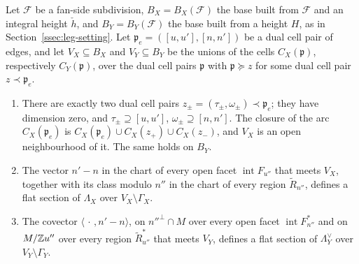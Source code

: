 \begin{lemma}\label{lem:closedarc}
Let $\mathcal F$ be a fan-side subdivision, $B_X=B_X(\mathcal F)$ the base built from $\mathcal F$ and an integral height
$\check h$, and $B_Y=B_Y(\mathcal F)$ the base built from a height $H$, as in Section~\ref{ssec:leg-setting}. Let
$\mathfrak p_e=([u,u'],[n,n'])$ be a dual cell pair of edges, and let $V_X\subseteq B_X$ and $V_Y\subseteq B_Y$ be the unions of
the cells $C_X(\mathfrak p)$, respectively $C_Y(\mathfrak p)$, over the dual cell pairs $\mathfrak p$ with $\mathfrak p\succeq z$ for
some dual cell pair $z\prec\mathfrak p_e$.
\begin{enumerate}
\item There are exactly two dual cell pairs $z_\pm=(\tau_\pm,\omega_\pm)\prec\mathfrak p_e$; they have dimension zero, and
$\tau_\pm\supseteq[u,u']$, $\omega_\pm\supseteq[n,n']$. The closure of the arc $C_X(\mathfrak p_e)$ is
$C_X(\mathfrak p_e)\cup C_X(z_+)\cup C_X(z_-)$, and $V_X$ is an open neighbourhood of it. The same holds on $B_Y$.
\item The vector $n'-n$ in the chart of every open facet $\operatorname{int}F_{u''}$ that meets $V_X$, together with its class
modulo $n''$ in the chart of every region $\widetilde R_{n''}$, defines a flat section of $\Lambda_X$ over
$V_X\setminus\Gamma_X$.
\item The covector $\langle\,\cdot\,,n'-n\rangle$, on $n''^\perp\cap M$ over every open facet $\operatorname{int}F^*_{n''}$
and on $M/\mathbb Z u''$ over every region $\widetilde R^*_{u''}$ that meets $V_Y$, defines a flat section of $\Lambda_Y^\vee$ over
$V_Y\setminus\Gamma_Y$.
\end{enumerate}
\end{lemma}

